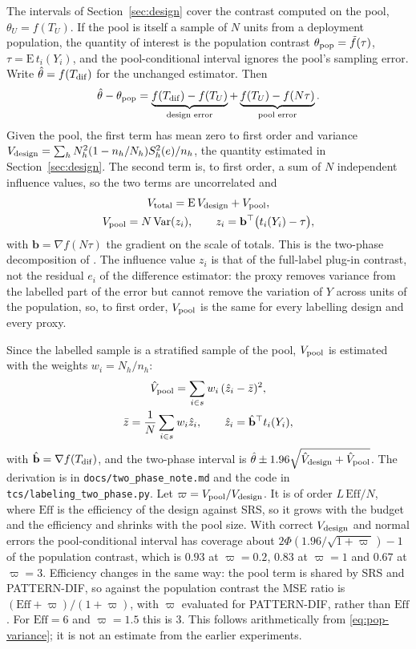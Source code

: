 \documentclass[pdflatex,sn-mathphys-num,iicol]{sn-jnl}
\theoremstyle{thmstyleone}
\theoremstyle{thmstyletwo}
\theoremstyle{thmstylethree}
\begin{document}
The intervals of Section~\ref{sec:design} cover the contrast computed on the pool, $\theta_U=f(T_U)$. If the pool is itself a sample of $N$ units from a deployment population, the quantity of interest is the population contrast $\theta_{\rm pop}=\tilde f(\tau)$, $\tau=\mathrm E\,t_i(Y_i)$, and the pool-conditional interval ignores the pool's sampling error. Write $\hat\theta=f(T_{\rm dif})$ for the unchanged estimator. Then
\[
\hat\theta-\theta_{\rm pop}=\underbrace{f(T_{\rm dif})-f(T_U)}_{\text{design error}}+\underbrace{f(T_U)-f(N\tau)}_{\text{pool error}} .
\]
Given the pool, the first term has mean zero to first order and variance $V_{\rm design}=\sum_h N_h^2(1-n_h/N_h)S_h^2(e)/n_h$, the quantity estimated in Section~\ref{sec:design}. The second term is, to first order, a sum of $N$ independent influence values, so the two terms are uncorrelated and
\begin{equation}\label{eq:pop-variance}
\begin{gathered}
V_{\rm total}=\mathrm E\,V_{\rm design}+V_{\rm pool},\\
V_{\rm pool}=N\,\mathrm{Var}(z_i),\qquad z_i=\mathbf b^{\top}\bigl(t_i(Y_i)-\tau\bigr),
\end{gathered}
\end{equation}
with $\mathbf b=\nabla f(N\tau)$ the gradient on the scale of totals. This is the two-phase decomposition of \citet{sarndal1987}. The influence value $z_i$ is that of the full-label plug-in contrast, not the residual $e_i$ of the difference estimator: the proxy removes variance from the labelled part of the error but cannot remove the variation of $Y$ across units of the population, so, to first order, $V_{\rm pool}$ is the same for every labelling design and every proxy.

Since the labelled sample is a stratified sample of the pool, $V_{\rm pool}$ is estimated with the weights $w_i=N_h/n_h$:
\[
\begin{gathered}
\hat V_{\rm pool}=\sum_{i\in s}w_i\,(\hat z_i-\bar z)^2,\\
\bar z=\frac1N\sum_{i\in s}w_i\hat z_i,\qquad \hat z_i=\hat{\mathbf b}^{\top}t_i(Y_i),
\end{gathered}
\]
with $\hat{\mathbf b}=\nabla f(T_{\rm dif})$, and the two-phase interval is $\hat\theta\pm1.96\sqrt{\hat V_{\rm design}+\hat V_{\rm pool}}$. The derivation is in \texttt{docs/two\_phase\_note.md} and the code in \texttt{tcs/labeling\_two\_phase.py}. Let $\varpi=V_{\rm pool}/V_{\rm design}$. It is of order $L\,\mathrm{Eff}/N$, where $\mathrm{Eff}$ is the efficiency of the design against SRS, so it grows with the budget and the efficiency and shrinks with the pool size. With correct $V_{\rm design}$ and normal errors the pool-conditional interval has coverage about $2\Phi(1.96/\sqrt{1+\varpi})-1$ of the population contrast, which is $0.93$ at $\varpi=0.2$, $0.83$ at $\varpi=1$ and $0.67$ at $\varpi=3$. Efficiency changes in the same way: the pool term is shared by SRS and PATTERN-DIF, so against the population contrast the MSE ratio is $(\mathrm{Eff}+\varpi)/(1+\varpi)$, with $\varpi$ evaluated for PATTERN-DIF, rather than $\mathrm{Eff}$. For $\mathrm{Eff}=6$ and $\varpi=1.5$ this is $3$. This follows arithmetically from \eqref{eq:pop-variance}; it is not an estimate from the earlier experiments.
\end{document}
